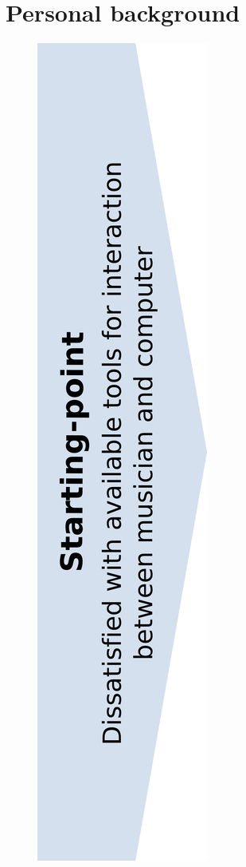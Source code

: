 
\section{Personal background}
\label{sec:personal-background}

\begin{figure}
  \centering
  \includegraphics[width=0.5\linewidth]{img/map9-starting-point}
  \label{fig:starting-point}
\end{figure}

